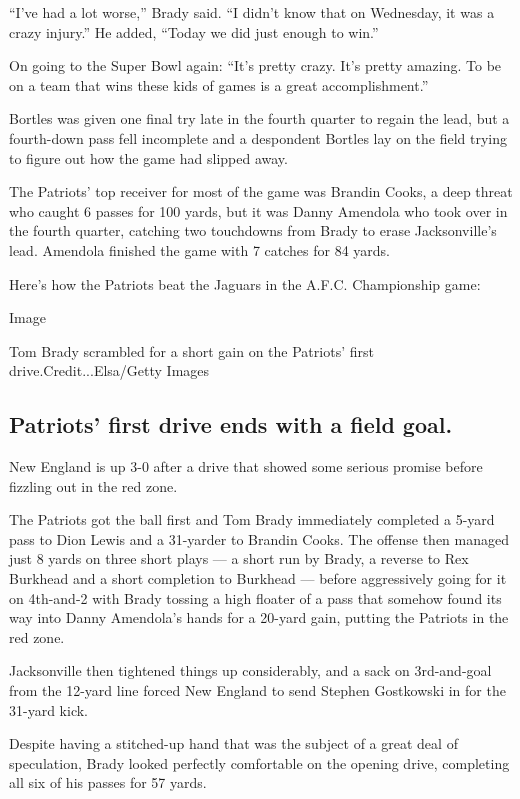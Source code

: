``I've had a lot worse,'' Brady said. ``I didn't know that on Wednesday,
it was a crazy injury.'' He added, ``Today we did just enough to win.''

On going to the Super Bowl again: ``It's pretty crazy. It's pretty
amazing. To be on a team that wins these kids of games is a great
accomplishment.''

Bortles was given one final try late in the fourth quarter to regain the
lead, but a fourth-down pass fell incomplete and a despondent Bortles
lay on the field trying to figure out how the game had slipped away.

The Patriots' top receiver for most of the game was Brandin Cooks, a
deep threat who caught 6 passes for 100 yards, but it was Danny Amendola
who took over in the fourth quarter, catching two touchdowns from Brady
to erase Jacksonville's lead. Amendola finished the game with 7 catches
for 84 yards.

Here's how the Patriots beat the Jaguars in the A.F.C. Championship
game:

Image

Tom Brady scrambled for a short gain on the Patriots' first
drive.Credit...Elsa/Getty Images

\hypertarget{patriots-first-drive-ends-with-a-field-goal}{%
\subsection{Patriots' first drive ends with a field
goal.}\label{patriots-first-drive-ends-with-a-field-goal}}

New England is up 3-0 after a drive that showed some serious promise
before fizzling out in the red zone.

The Patriots got the ball first and Tom Brady immediately completed a
5-yard pass to Dion Lewis and a 31-yarder to Brandin Cooks. The offense
then managed just 8 yards on three short plays --- a short run by Brady,
a reverse to Rex Burkhead and a short completion to Burkhead --- before
aggressively going for it on 4th-and-2 with Brady tossing a high floater
of a pass that somehow found its way into Danny Amendola's hands for a
20-yard gain, putting the Patriots in the red zone.

Jacksonville then tightened things up considerably, and a sack on
3rd-and-goal from the 12-yard line forced New England to send Stephen
Gostkowski in for the 31-yard kick.

Despite having a stitched-up hand that was the subject of a great deal
of speculation, Brady looked perfectly comfortable on the opening drive,
completing all six of his passes for 57 yards.

